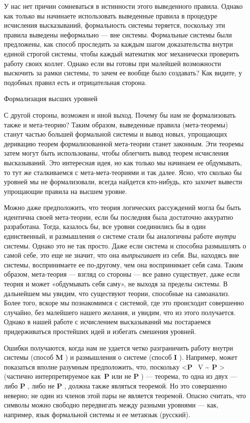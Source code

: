 У нас нет причин сомневаться в истинности этого выведенного правила. Однако как только вы начинаете использовать выведенные правила в процедуре исчисления высказываний, формальность системы теряется, поскольку эти правила выведены неформально --- вне системы. Формальные системы были предложены, как способ проследить за каждым шагом доказательства внутри единой строгой системы, чтобы каждый математик мог механически проверить работу своих коллег. Однако если вы готовы при малейшей возможности выскочить за рамки системы, то зачем ее вообще было создавать? Как видите, у подобных правил есть и отрицательная сторона.

Формализация высших уровней

С другой стороны, возможен и иной выход. Почему бы нам не формализовать также и мета-теорию? Таким образом, выведенные правила (мета-теоремы) станут частью большей формальной системы и вывод новых, упрощающих деривацию теорем формализованной мета-теории станет законным. Эти теоремы затем могут быть использованы, чтобы облегчить вывод теорем исчисления высказываний. Это интересная идея, но как только мы начинаем ее обдумывать, то тут же сталкиваемся с мета-мета-теориями и так далее. Ясно, что сколько бы уровней мы не формализовали, всегда найдется кто-нибудь, кто захочет вывести упрощающие правила на высшем уровне.

Можно даже предположить, что теория логических рассуждений могла бы быть идентична своей мета-теории, если бы последняя была достаточно аккуратно разработана. Тогда, казалось бы, все уровни соединились бы в один единственный, и размышления \emph{о} системе стали бы аналогичны работе \emph{внутри} системы. Однако это не так просто. Даже если система и способна размышлять о самой себе, это еще не значит, что она \emph{выпрыгивает} из себя. Вы, находясь вне системы, воспринимаете ее по-другому, чем она воспринимает себя сама. Таким образом, мета-теория --- взгляд со стороны --- все равно существует, даже если теория и может «обдумывать себя саму», не выходя за пределы системы. В дальнейшем мы увидим, что существуют теории, способные на самоанализ. Более того, вскоре мы познакомимся с системой, где это происходит совершенно случайно, без малейшего нашего желания, и увидим, что из этого получается. Однако в нашей работе с исчислением высказываний мы постараемся придерживаться простейших идей и избегать смешения уровней.

Ошибки получаются, когда нам не удается четко разграничить работу внутри системы (способ \textbf{M} ) и размышления о системе (способ \textbf{I} ). Например, может показаться вполне разумным предположить, что, поскольку \textless{}\textbf{P} ~V \textbf{\textasciitilde{} P} \textgreater{} (частично интерпретируемое как~\textbf{P} или не \textbf{P} ) --- теорема, то одна из двух --- либо \textbf{P} , либо не \textbf{P} , должна также являться теоремой. Но это совершенно неверно; не один из членов этой пары не является теоремой. Опасно считать, что символы можно свободно передвигать между разными уровнями --- как, например, язык формальной системы и ее метаязык (русский).

